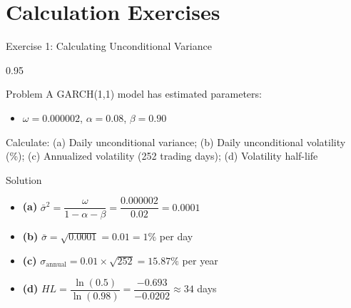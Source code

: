 \documentclass[9pt, aspectratio=169, t]{beamer}
\begin{document}
\section{Calculation Exercises}

\begin{frame}{Exercise 1: Calculating Unconditional Variance}
    \begin{cminipage}{0.95\textwidth}
    \begin{alertblock}{Problem}
        A GARCH(1,1) model has estimated parameters:
        \begin{itemize}\setlength{\itemsep}{0pt}
            \item $\omega = 0.000002$, $\alpha = 0.08$, $\beta = 0.90$
        \end{itemize}
        Calculate: (a) Daily unconditional variance; (b) Daily unconditional volatility (\%); (c) Annualized volatility (252 trading days); (d) Volatility half-life
    \end{alertblock}

    \vspace{0.2cm}
    \begin{exampleblock}{Solution}
        \begin{itemize}\setlength{\itemsep}{0pt}
            \item \textbf{(a)} $\bar{\sigma}^2 = \dfrac{\omega}{1 - \alpha - \beta} = \dfrac{0.000002}{0.02} = 0.0001$
            \item \textbf{(b)} $\bar{\sigma} = \sqrt{0.0001} = 0.01 = 1\%$ per day
            \item \textbf{(c)} $\sigma_{\text{annual}} = 0.01 \times \sqrt{252} = 15.87\%$ per year
            \item \textbf{(d)} $HL = \dfrac{\ln(0.5)}{\ln(0.98)} = \dfrac{-0.693}{-0.0202} \approx 34$ days
        \end{itemize}
    \end{exampleblock}
    \end{cminipage}
\end{frame}
\end{document}
